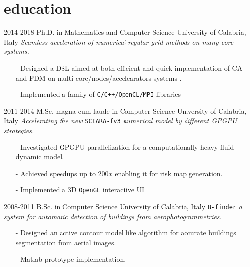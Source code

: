 \documentclass[]{twentysecondscv}
\begin{document}
\section{education}

\begin{twenty}
	\fivetwentyitem
	{2014-2018}
	{Ph.D. {\normalfont in Mathematics and Computer Science}}
	{University of Calabria, Italy}
	{\emph{Seamless acceleration of numerical regular grid methods on many-core systems.}}
	{
		\vspace{-15pt}
		\begin{itemize}[leftmargin=*]
			\footnotesize
			\item[-] Designed a DSL aimed at both efficient and quick implementation of CA and FDM on multi-core/nodes/accelearators systems \href{https://dl.acm.org/citation.cfm?id=3059134}{\faBook}.
			\item[-] Implemented a family of \texttt{C/C++/OpenCL/MPI} libraries \href{www.blablabla.it}{\faGithub} 
		\end{itemize} 
	}
	\fivetwentyitem
	{2011-2014}
	{M.Sc. magna cum laude in Computer Science}
	{University of Calabria, Italy}
	{\emph{Accelerating the new} \texttt{SCIARA-fv3} \emph{numerical model by different GPGPU strategies.}}
	{
		\vspace{-15pt}
		\begin{itemize}[leftmargin=*]
			\footnotesize
			\item[-] Investigated GPGPU parallelization for a computationally heavy fluid-dynamic model.
			\item[-] Achieved speedups up to $200x$ enabling it for risk map generation.
			\item[-] Implemented a 3D \texttt{OpenGL} interactive UI
		\end{itemize} 
	}
	\fivetwentyitem
	{2008-2011}
	{B.Sc. in Computer Science}
	{University of Calabria, Italy}
	{\texttt{B-finder}\emph{ a system for automatic detection of buildings from aerophotogrammetries.}}
	{
		\vspace{-15pt}
		\begin{itemize}[leftmargin=*]
			\footnotesize
			\item[-] Designed an active contour model like algorithm for accurate buildings segmentation from aerial images.
			\item[-] Matlab prototype implementation.
		\end{itemize} 
	}
\end{twenty}
\end{document}
